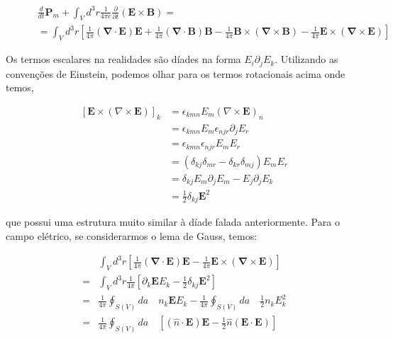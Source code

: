 \begin{equation}
	\begin{split}
		& \frac{d}{dt} \textbf{P}_m + \int_V d^3 r \frac{1}{4\pi c} \frac{\partial}{\partial t}\left( \textbf{E} \times \textbf{B}\right) = \\
		\qquad & =	\int_V d^3 r \left[ \frac{1}{4\pi}\left( \mathbf{\nabla} \cdot \textbf{E}\right)  \textbf{E} + \frac{1}{4\pi}\left( \mathbf{\nabla} \cdot \textbf{B}\right) \textbf{B}- \frac{1}{4\pi}  \textbf{B} \times \left( \mathbf{\nabla} \times \textbf{B}\right) - \frac{1}{4\pi }\textbf{E} \times (\mathbf{\nabla} \times \textbf{E})\right]
	\end{split}
\end{equation}

Os termos escalares na realidades são díades na forma $E_{i}\partial_{j}E_k$. Utilizando as convenções de Einstein, podemos olhar para os termos rotacionais acima onde temos,

\begin{equation*}
	\begin{split}
	\left[ \textbf{E} \times \left( \nabla \times \textbf{E}\right) \right]_k & = \epsilon_{kmn}E_m\left( \nabla \times \textbf{E}\right)_n  \\ 
	& = \epsilon_{kmn}E_m\epsilon_{njr}\partial_jE_r \\
	& = \epsilon_{kmn}\epsilon_{njr}E_mE_r\\
	& = \left(\delta_{kj}\delta_{mr}-\delta_{kr}\delta_{mj}\right) E_mE_r \\
	& = \delta_{kj}E_m\partial_j E_m - E_j\partial_j E_k \\
	& = \frac{1}{2}\delta_{kj}\textbf{E}^2
	\end{split}
\end{equation*}

que possui uma estrutura muito similar à díade falada anteriormente. Para o campo elétrico, se considerarmos o lema de Gauss, temos:

\begin{equation}
	\begin{split}
	& \int_V d^3 r \left[ \frac{1}{4\pi}\left( \mathbf{\nabla} \cdot \textbf{E}\right)  \textbf{E} - \frac{1}{4\pi }\textbf{E} \times (\mathbf{\nabla} \times \textbf{E}) \right] \\
	= & \int_V d^3 r \frac{1}{4\pi } \left[\partial_k\textbf{E}E_k - \frac{1}{2}\delta_{kj}\textbf{E}^2 \right] \\
	= & \frac{1}{4\pi }\oint_{S(V)} da\quad n_k\textbf{E}E_k -\frac{1}{4\pi } \oint_{S(V)} da\quad \frac{1}{2}n_k E_k^2\\
	= & \frac{1}{4\pi }\oint_{S(V)} da\quad \left[ (\hat{n}\cdot \textbf{E})\textbf{E} - \frac{1}{2}\hat{n} (\textbf{E}\cdot\textbf{E})\right]
	\end{split}
\end{equation}

